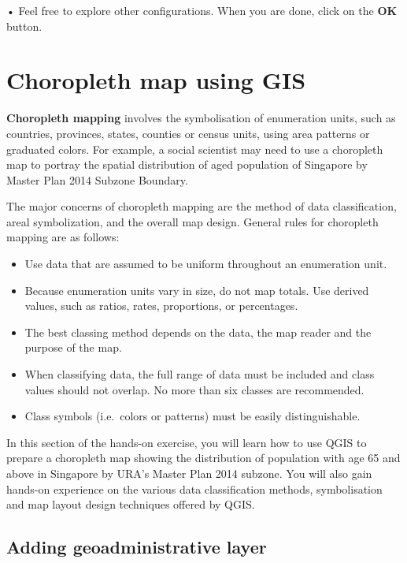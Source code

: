 \documentclass[
  letterpaper,
  DIV=11,
  numbers=noendperiod]{scrreprt}
\providecommand{\tightlist}{%
  \setlength{\itemsep}{0pt}\setlength{\parskip}{0pt}}\usepackage{longtable,booktabs,array}
\begin{document}
• Feel free to explore other configurations. When you are done, click on
the \textbf{OK} button.

\hypertarget{choropleth-map-using-gis}{%
\section{Choropleth map using GIS}\label{choropleth-map-using-gis}}

\textbf{Choropleth mapping} involves the symbolisation of enumeration
units, such as countries, provinces, states, counties or census units,
using area patterns or graduated colors. For example, a social scientist
may need to use a choropleth map to portray the spatial distribution of
aged population of Singapore by Master Plan 2014 Subzone Boundary.

The major concerns of choropleth mapping are the method of data
classification, areal symbolization, and the overall map design. General
rules for choropleth mapping are as follows:

\begin{itemize}
\tightlist
\item
  Use data that are assumed to be uniform throughout an enumeration
  unit.
\item
  Because enumeration units vary in size, do not map totals. Use derived
  values, such as ratios, rates, proportions, or percentages.
\item
  The best classing method depends on the data, the map reader and the
  purpose of the map.
\item
  When classifying data, the full range of data must be included and
  class values should not overlap. No more than six classes are
  recommended.
\item
  Class symbols (i.e.~colors or patterns) must be easily
  distinguishable.
\end{itemize}

In this section of the hands-on exercise, you will learn how to use QGIS
to prepare a choropleth map showing the distribution of population with
age 65 and above in Singapore by URA's Master Plan 2014 subzone. You
will also gain hands-on experience on the various data classification
methods, symbolisation and map layout design techniques offered by QGIS.

\hypertarget{adding-geoadministrative-layer}{%
\subsection{Adding geoadministrative
layer}\label{adding-geoadministrative-layer}}
\end{document}
